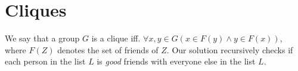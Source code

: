 %
%

\section{Cliques}
We say that a group $G$ is a clique iff. $\forall x,y \in G ( x \in F(y) \land
y \in F(x) )$, where $F(Z)$ denotes the set of friends of $Z$. Our solution
recursively checks if each person in the list $L$ is {\it good} friends with
everyone else in the list $L$.

